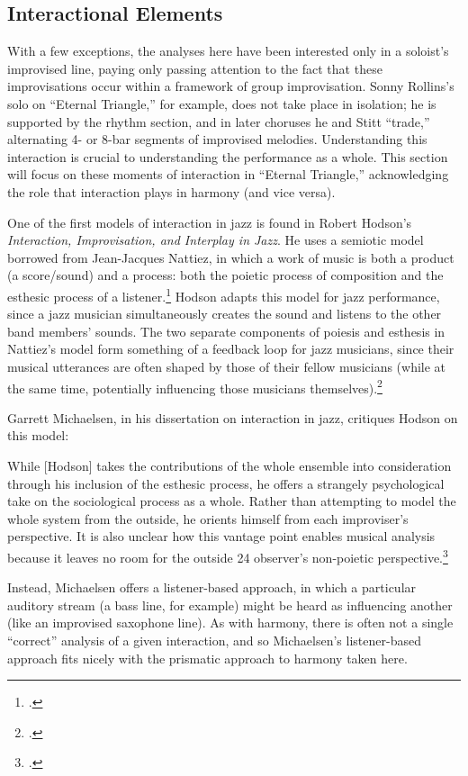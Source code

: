 \FloatBarrier
\subsection{Interactional Elements}

With a few exceptions, the analyses here have been interested only in a
soloist's improvised line, paying only passing attention to the fact that
these improvisations occur within a framework of group improvisation. Sonny
Rollins's solo on ``Eternal Triangle,'' for example, does not take place in
isolation; he is supported by the rhythm section, and in later choruses he and
Stitt ``trade,'' alternating 4- or 8-bar segments of improvised melodies.
Understanding this interaction is crucial to understanding the performance as
a whole. This section will focus on these moments of interaction in ``Eternal
Triangle,'' acknowledging the role that interaction plays in harmony (and vice
versa).

One of the first models of interaction in jazz is found in Robert Hodson's
\emph{Interaction, Improvisation, and Interplay in Jazz}. He uses a semiotic
model borrowed from Jean-Jacques Nattiez, in which a work of music is both a
product (a score/sound) and a process: both the poietic process of composition
and the esthesic process of a listener.\footcite[14--15]{hodson:2007} Hodson
adapts this model for jazz performance, since a jazz musician simultaneously
creates the sound and listens to the other band members' sounds. The two
separate components of poiesis and esthesis in Nattiez's model form something
of a feedback loop for jazz musicians, since their musical utterances are
often shaped by those of their fellow musicians (while at the same time,
potentially influencing those musicians
themselves).\footcite[15--16]{hodson:2007}

Garrett Michaelsen, in his dissertation on interaction in jazz, critiques
Hodson on this model:%
\begin{quoting}
  \singlespacing
  While [Hodson] takes the contributions of the whole ensemble into consideration
  through his inclusion of the esthesic process, he offers a strangely
  psychological take on the sociological process as a whole. Rather than
  attempting to model the whole system from the outside, he orients himself
  from each improviser’s perspective. It is also unclear how this vantage
  point enables musical analysis because it leaves no room for the outside 24
  observer’s non-poietic perspective.\footcite[24--25]{michaelsen:2013}
\end{quoting}
%
Instead, Michaelsen offers a listener-based approach, in which a particular
auditory stream (a bass line, for example) might be heard as influencing
another (like an improvised saxophone line). As with harmony, there
is often not a single ``correct'' analysis of a given interaction, and so
Michaelsen's listener-based approach fits nicely with the prismatic approach
to harmony taken here.

